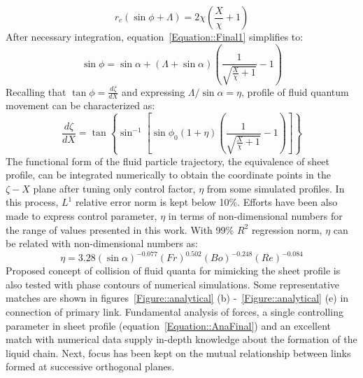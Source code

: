 \begin{equation}\label{Equation::Final1}
r_c\left(\sin\phi + \Lambda\right) = 2\chi\left(\frac{X}{\chi} + 1\right)
\end{equation} 
After necessary integration, equation~\ref{Equation::Final1} simplifies to:
\begin{equation}
\sin\phi  = \sin\alpha + \left(\Lambda + \sin\alpha\right)\left(\frac{1}{\sqrt{\frac{X}{\chi} + 1}} - 1\right)    
\end{equation}
Recalling that $\tan\phi = \frac{d\zeta}{dX}$ and expressing $\Lambda/\sin\alpha = \eta$, profile of fluid quantum movement can be characterized as:
\begin{equation}
\label{Equation::AnaFinal}
\frac{d\zeta}{dX} = \tan\left\lbrace\sin^{-1}\left[ \sin\phi_0\left(1 + \eta\right)\left(\frac{1}{\sqrt{\frac{X}{\chi} + 1}} - 1\right) \right]\right\rbrace
\end{equation}
The functional form of the fluid particle trajectory, the equivalence of sheet profile, can be integrated numerically to obtain the coordinate points in the $\zeta-X$ plane after tuning only control factor, $\eta$ from some simulated profiles. In this process, $L^1$ relative error norm is kept below 10\%. Efforts have been also made to express control parameter, $\eta$ in terms of non-dimensional numbers for the range of values presented in this work. With 99\% $R^2$ regression norm, $\eta$ can be related with non-dimensional numbers as:
\begin{equation}\label{Equation::eta}
\eta = 3.28(\sin\alpha)^{-0.077}(Fr)^{0.502}(Bo)^{-0.248}\left(Re\right)^{-0.084}
\end{equation}
Proposed concept of collision of fluid quanta for mimicking the sheet profile is also tested with phase contours of numerical simulations. Some representative matches are shown in figures~\ref{Figure::analytical} (b) -~\ref{Figure::analytical} (e) in connection of primary link. Fundamental analysis of forces, a single controlling parameter in sheet profile (equation~\ref{Equation::AnaFinal}) and an excellent match with numerical data supply in-depth knowledge about the formation of the liquid chain. Next, focus has been kept on the mutual relationship between links formed at successive orthogonal planes. 
